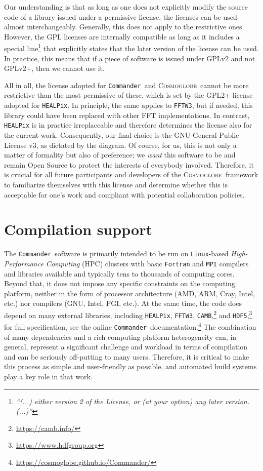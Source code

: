 \documentclass[twocolumn]{openjournal}
\def\commander{\texttt{Commander}}
\newcommand{\cosmoglobe}{\textsc{Cosmoglobe}}
\begin{document}
Our understanding is that as long as one does not explicitly modify the source
code of a library issued under a permissive license, the licenses can be used
almost interchangeably. Generally, this does not apply to the restrictive ones.
However, the GPL licenses are internally compatible as long as it includes a
special line\footnote{ \textit{``(...) either version 2 of the License, or (at
your option) any later version. (...)''}}  that explicitly states that the
later version of the license can be used. In practice, this means that if a
piece of software is issued under GPLv2 and not GPLv2+, then we cannot use it.  

All in all, the license adopted for \commander\ and \cosmoglobe\ cannot be more
restrictive than the most permissive of these, which is set by the GPL2+
license adopted for \texttt{HEALPix}. In principle, the same applies to
\texttt{FFTW3}, but if needed, this library could have been replaced with other
FFT implementations. In contrast, \texttt{HEALPix} is in practice irreplaceable
and therefore determines the license also for the current work. Consequently,
our final choice is the GNU General Public License v3, as dictated by the
diagram. Of course, for us, this is not only a matter of formality but also of
preference; we \emph{want} this software to be and remain Open Source to
protect the interests of everybody involved. Therefore, it is crucial for all
future participants and developers of the \cosmoglobe\ framework to familiarize
themselves with this license and determine whether this is acceptable for one's
work and compliant with potential collaboration policies.

\section{Compilation support}
\label{sec:compilation_support}

The \commander\ software is primarily intended to be run on
\texttt{Linux}-based \textit{High-Performance Computing} (HPC) clusters with
basic \texttt{Fortran} and \texttt{MPI} compilers and libraries available and
typically tens to thousands of computing cores. Beyond that, it does not impose
any specific constraints on the computing platform, neither in the form of
processor architecture (AMD, ARM, Cray, Intel, etc.)  nor compilers (GNU,
Intel, PGI, etc.). At the same time, the code does depend on many external
libraries, including \texttt{HEALPix}, \texttt{FFTW3},
\texttt{CAMB},\footnote{\url{https://camb.info/}} and
\texttt{HDF5};\footnote{\url{https://www.hdfgroup.org}} for full specification,
see the online \commander\
documentation.\footnote{\url{https://cosmoglobe.github.io/Commander/}} The
combination of many dependencies and a rich computing platform heterogeneity
can, in general, represent a significant challenge and workload in terms of
compilation and can be seriously off-putting to many users. Therefore, it is
critical to make this process as simple and user-friendly as possible, and
automated build systems play a key role in that work.
\end{document}
